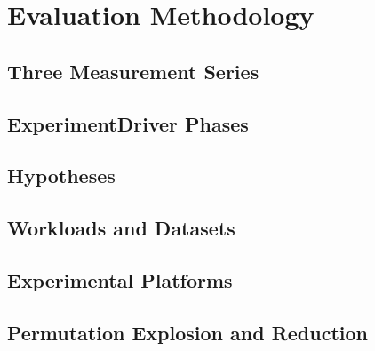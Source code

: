 \chapter{Evaluation Methodology}\label{ch:methodology}


\section{Three Measurement Series}\label{sec:series}

\section{ExperimentDriver Phases}\label{sec:experimentdriver}

\section{Hypotheses}\label{sec:hypotheses}

\section{Workloads and Datasets}\label{sec:workloads}

\section{Experimental Platforms}\label{sec:platforms}

\section{Permutation Explosion and Reduction}\label{sec:explosion}

